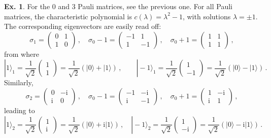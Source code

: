 \documentclass[a4paper,12pt]{article}
\def\imagi{\mathrm{i}}
\theoremstyle{definition}
\newtheorem{exercise}{Ex.}[section]
\begin{document}
\begin{exercise}\label{ex:pauliEig}
 For the 0 and 3 Pauli matrices, see the previous one. For all Pauli matrices, the characteristic polynomial is $c(\lambda)=\lambda^2-1$, with solutions $\lambda=\pm 1$. The corresponding eigenvectors are easily read off:
 \[
  \sigma_1 = \begin{pmatrix}0& 1 \\ 1& 0 \end{pmatrix}\,,\quad \sigma_0-1 = \begin{pmatrix}-1 & 1 \\ 1 & -1 \end{pmatrix}\,,\quad \sigma_0+1 = \begin{pmatrix} 1 & 1 \\ 1 & 1 \end{pmatrix}\,,
 \]
 from where
 \[
  |1\rangle_1 = \frac{1}{\sqrt{2}}\begin{pmatrix}1\\ 1\end{pmatrix} = \frac{1}{\sqrt{2}}(|0\rangle + |1\rangle)\,,\quad\quad |-1\rangle_1 = \frac{1}{\sqrt{2}}\begin{pmatrix}1\\ -1\end{pmatrix} = \frac{1}{\sqrt{2}}(|0\rangle - |1\rangle)\,.
 \]
 Similarly,
\[
  \sigma_2 = \begin{pmatrix}0& -\imagi \\ \imagi& 0 \end{pmatrix}\,,\quad \sigma_0-1 = \begin{pmatrix}-1 & -\imagi \\ \imagi & -1 \end{pmatrix}\,,\quad \sigma_0+1 = \begin{pmatrix} 1 & -\imagi \\ \imagi & 1 \end{pmatrix}\,,
 \]
 leading to
 \[
  |1\rangle_2 = \frac{1}{\sqrt{2}}\begin{pmatrix} 1\\\imagi\end{pmatrix} = \frac{1}{\sqrt{2}}(|0\rangle + \imagi |1\rangle)\,,\quad 
  |-1\rangle_2 = \frac{1}{\sqrt{2}}\begin{pmatrix} 1\\-\imagi\end{pmatrix} = \frac{1}{\sqrt{2}}(|0\rangle - \imagi |1\rangle)\,.
 \]
\end{exercise}
\end{document}
